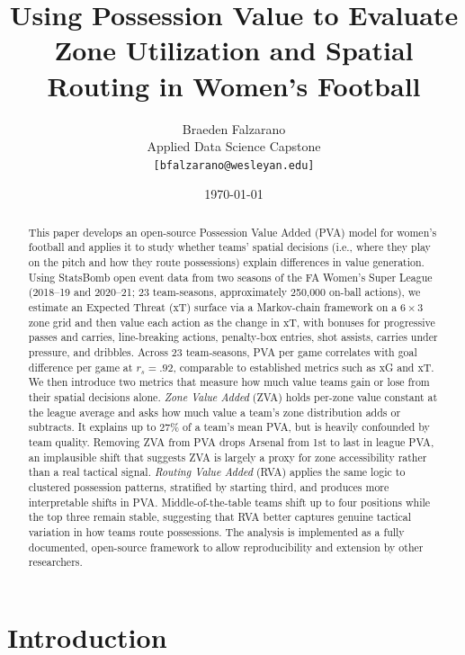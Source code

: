 \documentclass[12pt,a4paper]{article}
\title{\textbf{Using Possession Value to Evaluate Zone Utilization and Spatial Routing in Women’s Football}}
\author{
    Braeden Falzarano \\
    Applied Data Science Capstone \\
    \texttt{[bfalzarano@wesleyan.edu]}
}
\date{\today}
\begin{document}
\maketitle

\begin{abstract}
This paper develops an open-source Possession Value Added (PVA) model for women’s football and applies it to study whether teams’ spatial decisions (i.e., where they play on the pitch and how they route possessions) explain differences in value generation. Using StatsBomb open event data from two seasons of the FA Women’s Super League (2018--19 and 2020--21; 23 team-seasons, approximately 250,000 on-ball actions), we estimate an Expected Threat (xT) surface via a Markov-chain framework on a $6 \times 3$ zone grid and then value each action as the change in xT, with bonuses for progressive passes and carries, line-breaking actions, penalty-box entries, shot assists, carries under pressure, and dribbles. Across 23 team-seasons, PVA per game correlates with goal difference per game at $r_s = .92$, comparable to established metrics such as xG and xT. We then introduce two metrics that measure how much value teams gain or lose from their spatial decisions alone. \textit{Zone Value Added} (ZVA) holds per-zone value constant at the league average and asks how much value a team’s zone distribution adds or subtracts. It explains up to 27\% of a team’s mean PVA, but is heavily confounded by team quality. Removing ZVA from PVA drops Arsenal from 1st to last in league PVA, an implausible shift that suggests ZVA is largely a proxy for zone accessibility rather than a real tactical signal. \textit{Routing Value Added} (RVA) applies the same logic to clustered possession patterns, stratified by starting third, and produces more interpretable shifts in PVA. Middle-of-the-table teams shift up to four positions while the top three remain stable, suggesting that RVA better captures genuine tactical variation in how teams route possessions. The analysis is implemented as a fully documented, open-source framework to allow reproducibility and extension by other researchers.
\end{abstract}

\newpage
\tableofcontents
\newpage

\section{Introduction}
\end{document}
